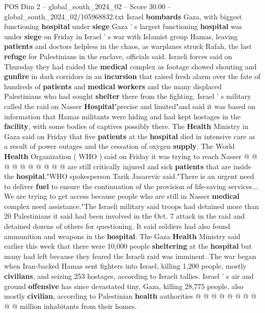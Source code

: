 \begin{textsample}{POS Dim 2 – global\_south\_2024\_02 – Score 30.00 – global\_south\_2024\_02/105968832.txt}  \label{ex:f2_pos_031}
Israel \textbf{bombards} Gaza, with biggest functioning \textbf{hospital} under \textbf{siege} Gaza ' s largest functioning \textbf{hospital} was under \textbf{siege} on Friday in Israel ' s war with Islamist group Hamas, leaving \textbf{patients} and doctors helpless in the chaos, as warplanes struck Rafah, the last \textbf{refuge} for Palestinians in the enclave, officials said.
Israeli forces said on Thursday they had raided the \textbf{medical} complex as footage showed shouting and \textbf{gunfire} in dark corridors in an \textbf{incursion} that raised fresh alarm over the fate of hundreds of \textbf{patients} and \textbf{medical} \textbf{workers} and the many displaced Palestinians who had sought \textbf{shelter} there from the fighting.
Israel ' s military called the raid on Nasser \textbf{Hospital}"precise and limited"and said it was based on information that Hamas militants were hiding and had kept hostages in the \textbf{facility}, with some bodies of captives possibly there.
The \textbf{Health} Ministry in Gaza said on Friday that five \textbf{patients} at the \textbf{hospital} died in intensive care as a result of power outages and the cessation of oxygen \textbf{supply}.
The World \textbf{Health} Organization ( WHO ) said on Friday it was trying to reach Nasser @ @ @ @ @ @ @ @ @ @ are still critically injured and sick \textbf{patients} that are inside the \textbf{hospital},"WHO spokesperson Tarik Jasarevic said."There is an urgent need to deliver \textbf{fuel} to ensure the continuation of the provision of life-saving services...
We are trying to get access because people who are still in Nasser \textbf{medical} complex need assistance."The Israeli military said troops had detained more than 20 Palestinians it said had been involved in the Oct. 7 attack in the raid and detained dozens of others for questioning.
It said soldiers had also found ammunition and weapons in the \textbf{hospital}.
The Gaza \textbf{Health} Ministry said earlier this week that there were 10,000 people \textbf{sheltering} at the \textbf{hospital} but many had left because they feared the Israeli raid was imminent.
The war began when Iran-backed Hamas sent fighters into Israel, killing 1,200 people, mostly \textbf{civilians}, and seizing 253 hostages, according to Israeli tallies.
Israel ' s air and ground \textbf{offensive} has since devastated tiny, Gaza, killing 28,775 people, also mostly \textbf{civilian}, according to Palestinian \textbf{health} authorities @ @ @ @ @ @ @ @ @ @ million inhabitants from their homes.

\end{textsample}

